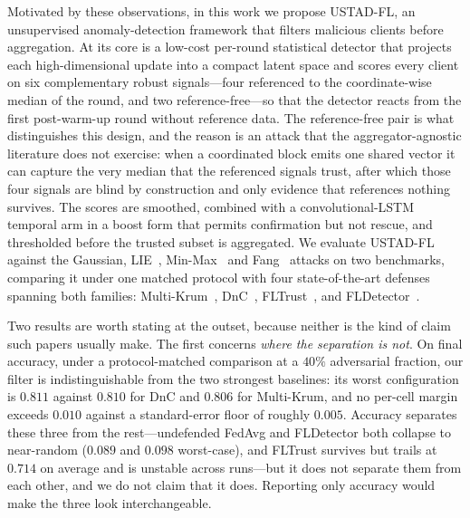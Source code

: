 \documentclass[journal]{IEEEtran}
\begin{document}
Motivated by these observations, in this work we propose USTAD-FL, an unsupervised anomaly-detection framework that filters malicious clients before aggregation. At its core is a low-cost per-round statistical detector that projects each high-dimensional update into a compact latent space and scores every client on six complementary robust signals---four referenced to the coordinate-wise median of the round, and two reference-free---so that the detector reacts from the first post-warm-up round without reference data. The reference-free pair is what distinguishes this design, and the reason is an attack that the aggregator-agnostic literature does not exercise: when a coordinated block emits one shared vector it can capture the very median that the referenced signals trust, after which those four signals are blind by construction and only evidence that references nothing survives. The scores are smoothed, combined with a convolutional-LSTM temporal arm in a boost form that permits confirmation but not rescue, and thresholded before the trusted subset is aggregated. We evaluate USTAD-FL against the Gaussian, LIE~\cite{baruch2019little}, Min-Max~\cite{shejwalkar2021manipulating} and Fang~\cite{fang2020local} attacks on two benchmarks, comparing it under one matched protocol with four state-of-the-art defenses spanning both families: Multi-Krum~\cite{blanchard2017machine}, DnC~\cite{shejwalkar2021manipulating}, FLTrust~\cite{cao2020fltrust}, and FLDetector~\cite{zhang2022fldetector}.

Two results are worth stating at the outset, because neither is the kind of claim such papers usually make. The first concerns \emph{where the separation is not}. On final accuracy, under a protocol-matched comparison at a $40\%$ adversarial fraction, our filter is indistinguishable from the two strongest baselines: its worst configuration is $0.811$ against $0.810$ for DnC and $0.806$ for Multi-Krum, and no per-cell margin exceeds $0.010$ against a standard-error floor of roughly $0.005$. Accuracy separates these three from the rest---undefended FedAvg and FLDetector both collapse to near-random ($0.089$ and $0.098$ worst-case), and FLTrust survives but trails at $0.714$ on average and is unstable across runs---but it does not separate them from each other, and we do not claim that it does. Reporting only accuracy would make the three look interchangeable.
\end{document}
